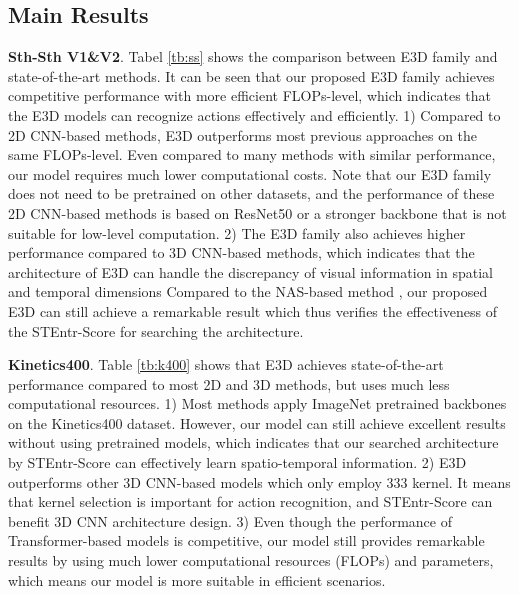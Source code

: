 \documentclass{article} \usepackage{iclr2023_conference,times}
\begin{document}
\subsection{Main Results}


\noindent\textbf{Sth-Sth V1\&V2}.
Tabel \ref{tb:ss} shows the comparison between E3D family and state-of-the-art methods.
It can be seen that our proposed E3D family achieves competitive performance with more efficient FLOPs-level, which indicates that the E3D models can recognize actions effectively and efficiently.
1) Compared to 2D CNN-based methods, E3D outperforms most previous approaches on the same FLOPs-level.
Even compared to many methods with similar performance, our model requires much lower computational costs.
Note that our E3D family does not need to be pretrained on other datasets, and the performance of these 2D CNN-based methods is based on ResNet50 or a stronger backbone that is not suitable for low-level computation.
2) The E3D family also achieves higher performance compared to 3D CNN-based methods, which indicates that the architecture of E3D can      handle the discrepancy of visual information in spatial and temporal dimensions
Compared to the NAS-based method \citep{kondratyuk2021movinets}, our proposed E3D can still achieve a remarkable result which thus verifies the effectiveness of the STEntr-Score for searching the architecture.




\noindent\textbf{Kinetics400}.
Table \ref{tb:k400} shows that E3D achieves state-of-the-art performance compared to most 2D and 3D methods, but uses much less computational resources.
1) Most methods apply ImageNet pretrained backbones on the Kinetics400 dataset. However, our model can still achieve excellent results without using pretrained models, which indicates that our searched architecture by STEntr-Score can effectively learn spatio-temporal information.
2) E3D outperforms other 3D CNN-based models \citep{carreira2017i3d,xie2018s3d,feichtenhofer2020x3d} which only employ 333 kernel. It means that kernel selection is important for action recognition, and STEntr-Score can benefit 3D CNN architecture design. 
3) Even though the performance of Transformer-based models \citep{bertasius2021timesformer,neimark2021video,liu2022video} is competitive, our model still provides remarkable results by using much lower computational resources (FLOPs) and parameters, which means our model is more suitable in efficient scenarios.
\end{document}
